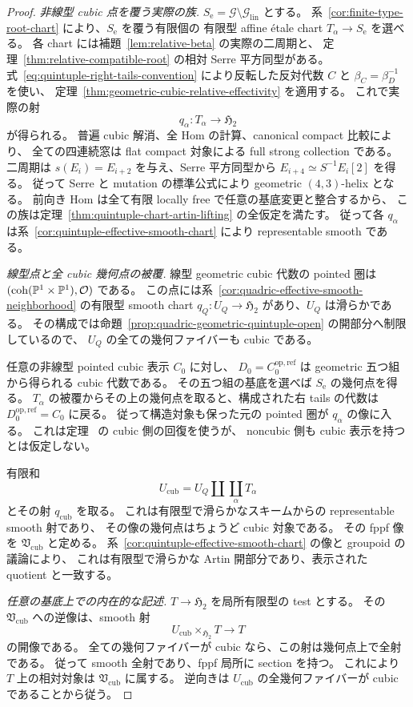 \begin{proof}
\emph{非線型 cubic 点を覆う実際の族.}
$S_{\mathrm e}=\mathscr G\setminus\mathscr G_{\mathrm{lin}}$ とする。
系~\ref{cor:finite-type-root-chart} により、$S_{\mathrm e}$ を覆う有限個の
有限型 affine étale chart $T_\alpha\to S_{\mathrm e}$ を選べる。
各 chart には補題~\ref{lem:relative-beta} の実際の二周期と、
定理~\ref{thm:relative-compatible-root} の相対 Serre 平方同型がある。
式~\eqref{eq:quintuple-right-tails-convention} により反転した反対代数 $C$ と
$\beta_C=\beta_D^{-1}$ を使い、
定理~\ref{thm:geometric-cubic-relative-effectivity} を適用する。
これで実際の射
\[
 q_\alpha:T_\alpha\longrightarrow\mathfrak H_2
\]
が得られる。
普遍 cubic 解消、全 Hom の計算、canonical compact 比較により、
全ての四連続窓は flat compact 対象による full strong collection である。
二周期は $s(E_i)=E_{i+2}$ を与え、Serre 平方同型から $E_{i+4}\simeq S^{-1}E_i[2]$ を得る。
従って Serre と mutation の標準公式により geometric $(4,3)$-helix となる。
前向き Hom は全て有限 locally free で任意の基底変更と整合するから、
この族は定理~\ref{thm:quintuple-chart-artin-lifting} の全仮定を満たす。
従って各 $q_\alpha$ は系~\ref{cor:quintuple-effective-smooth-chart} により
representable smooth である。

\emph{線型点と全 cubic 幾何点の被覆.}
線型 geometric cubic 代数の pointed 圏は
$(\operatorname{coh}(\mathbb P^1\times\mathbb P^1),\mathcal O)$ である。
この点には系~\ref{cor:quadric-effective-smooth-neighborhood} の有限型 smooth chart
$q_Q:U_Q\to\mathfrak H_2$ があり、$U_Q$ は滑らかである。
その構成では命題~\ref{prop:quadric-geometric-quintuple-open} の開部分へ制限しているので、
$U_Q$ の全ての幾何ファイバーも cubic である。

任意の非線型 pointed cubic 表示 $C_0$ に対し、
$D_0=C_0^{\mathrm{op,ref}}$ は geometric 五つ組から得られる cubic 代数である。
その五つ組の基底を選べば $S_{\mathrm e}$ の幾何点を得る。
$T_\alpha$ の被覆からその上の幾何点を取ると、構成された右 tails の代数は
$D_0^{\mathrm{op,ref}}=C_0$ に戻る。
従って構造対象も保った元の pointed 圏が $q_\alpha$ の像に入る。
これは定理~\cite[\texttt{thm:complete-h2-classification}]{QuadricIntrinsic2026} の cubic 側の回復を使うが、
noncubic 側も cubic 表示を持つとは仮定しない。

有限和
\[
 U_{\mathrm{cub}}=U_Q\amalg\coprod_\alpha T_\alpha
\]
とその射 $q_{\mathrm{cub}}$ を取る。
これは有限型で滑らかなスキームからの representable smooth 射であり、
その像の幾何点はちょうど cubic 対象である。
その fppf 像を $\mathfrak V_{\mathrm{cub}}$ と定める。
系~\ref{cor:quintuple-effective-smooth-chart} の像と groupoid の議論により、
これは有限型で滑らかな Artin 開部分であり、表示された quotient と一致する。

\emph{任意の基底上での内在的な記述.}
$T\to\mathfrak H_2$ を局所有限型の test とする。
その $\mathfrak V_{\mathrm{cub}}$ への逆像は、smooth 射
\[
 U_{\mathrm{cub}}\times_{\mathfrak H_2}T\longrightarrow T
\]
の開像である。
全ての幾何ファイバーが cubic なら、この射は幾何点上で全射である。
従って smooth 全射であり、fppf 局所に section を持つ。
これにより $T$ 上の相対対象は $\mathfrak V_{\mathrm{cub}}$ に属する。
逆向きは $U_{\mathrm{cub}}$ の全幾何ファイバーが cubic であることから従う。
\end{proof}


